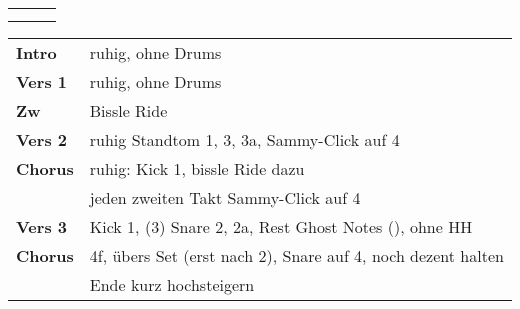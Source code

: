 

\begin{tabular}{p{0.6cm}p{12cm}p{1.4cm}}
	\rowcolor{cyan} \myRow{\thesongnumber} & \myRow{Gotteslamm} & \myRow{70} \\
	                                       &                    &            \\
\end{tabular}

\begin{tabular}{p{1.6cm}l}
	\textbf{Intro}  & ruhig, ohne Drums                                                 \\
	\textbf{Vers 1} & ruhig, ohne Drums                                                 \\
	\textbf{Zw}     & Bissle Ride                                                       \\
	\textbf{Vers 2} & ruhig Standtom 1, 3, 3a, Sammy-Click auf 4                        \\
	\textbf{Chorus} & ruhig: Kick 1, bissle Ride dazu                                   \\
	                & jeden zweiten Takt Sammy-Click auf 4                              \\
	\textbf{Vers 3} & Kick 1, (3) Snare 2, 2a, Rest Ghost Notes (\sechzehntel), ohne HH \\
	\textbf{Chorus} & 4f, übers Set (erst nach 2), Snare auf 4, noch dezent halten      \\
	                & Ende kurz \achtel hochsteigern                                    \\

\end{tabular}
